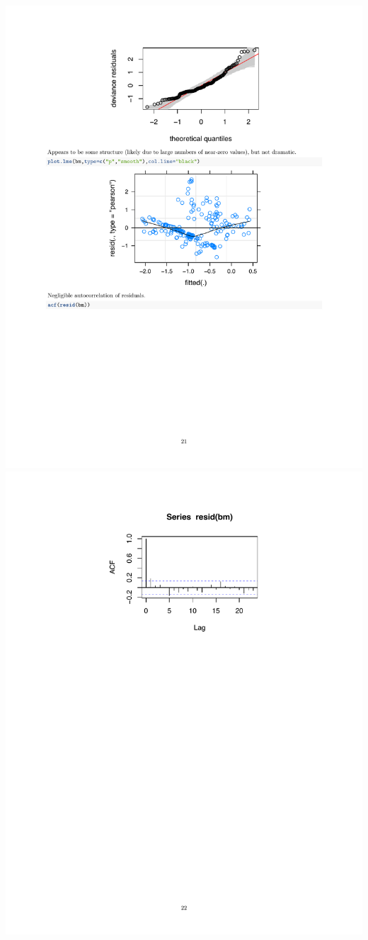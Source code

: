 \documentclass[a4paper, twoside]{templates/ociamthesis}
\begin{document}
\includegraphics[width=1\linewidth]{pdf_chapters/lights/lights_supp_crop_Part55}
\includegraphics[width=1\linewidth]{pdf_chapters/lights/lights_supp_crop_Part56}
\end{document}
